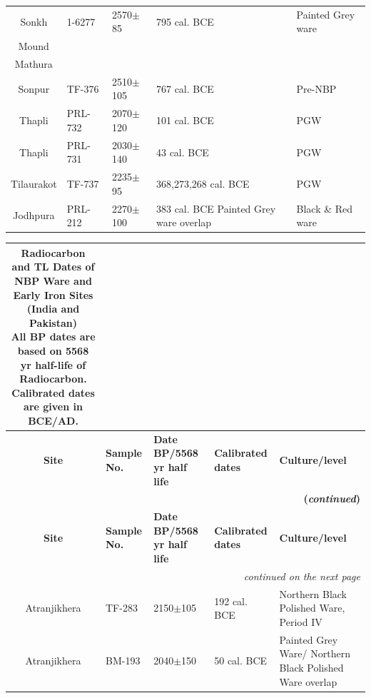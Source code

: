 {{{\begin{longtable}{|c|p{1.4cm}|p{1cm}|p{1.5cm}|p{3cm}|}
Sonkh & 1-6277 & 2570$\pm$85 & 795 cal. BCE &Painted Grey ware\\
Mound & & & & \\
Mathura & & & & \\
Sonpur & TF-376 & 2510$\pm$105 & 767 cal. BCE &Pre-NBP\\
Thapli & PRL- 732 & 2070$\pm$120 & 101 cal. BCE & PGW\\
Thapli & PRL- 731 & 2030$\pm$140 & 43 cal. BCE &PGW\\
Tilaurakot & TF-737 & 2235$\pm$95 & 368,273,268 cal. BCE &PGW\\
Jodhpura & PRL-212 & 2270$\pm$100 & 383 cal. BCE Painted Grey ware overlap & Black \& Red ware
\end{longtable}
}}

{\setlength\tabcolsep{2pt}
{\fontsize{8}{10}\selectfont
\begin{longtable}{|c|p{1.1cm}|p{1.2cm}|p{1.8cm}|p{3.3cm}|}
\captionsetup{font=footnotesize}
\caption{Radiocarbon and TL Dates of NBP Ware and Early Iron Sites\\
(India and Pakistan)\\ [5pt]
All BP dates are based on 5568 yr half-life of Radiocarbon. \\[3pt] 
Calibrated dates are given in BCE/AD.\label{table III.6}}\\
\hline
\multicolumn{1}{|m{1.3cm}|}{\centering \textbf{Site}} &\multicolumn{1}{m{1.1cm}|}{\centering \textbf{Sample No.}}&\multicolumn{1}{m{1.2cm}|}{\centering \textbf{Date BP/5568 yr half life}}& \multicolumn{1}{m{1.8cm}|}{\centering \textbf{Calibrated dates}}& \multicolumn{1}{m{3.3cm}|}{\centering \textbf{Culture/level}}\\
\endfirsthead
\multicolumn{5}{r}{\textbf{(\textit{continued})}}\\[5pt]
\hline
\multicolumn{1}{|m{1.3cm}|}{\centering \textbf{Site}} &\multicolumn{1}{m{1.1cm}|}{\centering \textbf{Sample No.}}&\multicolumn{1}{m{1.2cm}|}{\centering \textbf{Date BP/5568 yr half life}}& \multicolumn{1}{m{1.8cm}|}{\centering \textbf{Calibrated dates}}& \multicolumn{1}{m{3.3cm}|}{\centering \textbf{Culture/level}}\\
\hline
\endhead
\hline
\multicolumn{5}{r}{\small\itshape continued on the next page}\\
\endfoot
\endlastfoot
\hline
Atranjikhera & TF-283 & 2150$\pm$105 & 192 cal. BCE &Northern Black Polished Ware, Period IV\\
Atranjikhera & BM-193 & 2040$\pm$150 & 50 cal. BCE & Painted Grey Ware/ Northern Black Polished Ware overlap\\

\end{longtable}}}}
